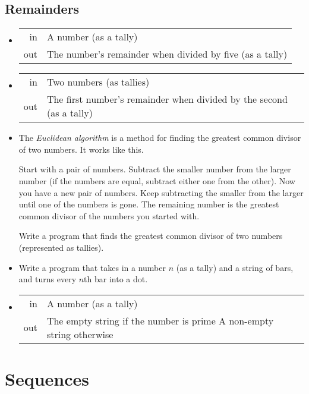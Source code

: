 \documentclass{article}
\newcommand*{\writeit}{\item[\NibRight]}
\newcommand{\spec}[1]{{\sc #1}}
\begin{document}
\subsection*{Remainders}
\begin{itemize}
\writeit
\begin{tabular}{rl}
\spec{in} & A number (as a tally) \\
\spec{out} & The number's remainder when divided by five (as a tally)
\end{tabular}
\writeit
\begin{tabular}{rl}
\spec{in} & Two numbers (as tallies) \\
\spec{out} & The first number's remainder when divided by the second (as a tally)
\end{tabular}
\writeit
The {\em Euclidean algorithm} is a method for finding the greatest common divisor of two numbers. It works like this.

Start with a pair of numbers. Subtract the smaller number from the larger number (if the numbers are equal, subtract either one from the other). Now you have a new pair of numbers. Keep subtracting the smaller from the larger until one of the numbers is gone. The remaining number is the greatest common divisor of the numbers you started with.

Write a program that finds the greatest common divisor of two numbers (represented as tallies).
\writeit Write a program that takes in a number $n$ (as a tally) and a string of bars, and turns every $n$th bar into a dot.
\writeit
\begin{tabularx}{\textwidth}{rX}
\spec{in} & A number (as a tally) \\
\spec{out} & The empty string if the number is prime \newline A non-empty string otherwise
\end{tabularx}
\end{itemize}
\section*{Sequences}
\end{document}
